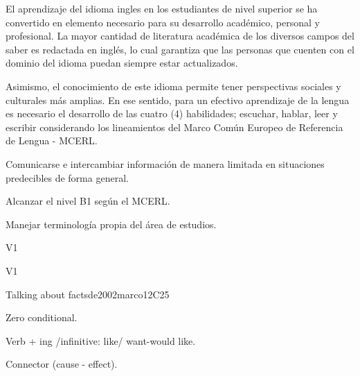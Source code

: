 \begin{syllabus}


\begin{justification}
El aprendizaje del idioma ingles en los estudiantes de nivel superior 
se ha convertido en elemento necesario para su desarrollo académico, personal y 
profesional. La mayor cantidad de literatura académica de los diversos campos 
del saber es redactada en inglés, lo cual garantiza que las personas que 
cuenten con el dominio del idioma puedan siempre estar actualizados. 

Asimismo, el conocimiento de este idioma permite tener perspectivas sociales y 
culturales más amplias. En ese sentido, para un efectivo aprendizaje de la 
lengua es necesario el desarrollo de las cuatro (4) habilidades; escuchar, 
hablar, leer y escribir considerando los lineamientos del 
Marco Común Europeo de Referencia de Lengua - MCERL.
\end{justification}

\begin{goals}
\item Comunicarse e intercambiar información de manera limitada en situaciones predecibles de forma general.
\item Alcanzar el nivel B1 según el MCERL.
\item Manejar terminología propia del área de estudios.
\end{goals}

\begin{outcomes}{V1}
\item {}
\end{outcomes}

\begin{competences}{V1}
\item {}
\end{competences}

\begin{unit}{Talking about facts}{}{de2002marco}{12}{C25}
   \begin{topics}
      \item Zero conditional.
      \item Verb + ing /infinitive: like/ want-would like.
      \item Connector (cause - effect).
   \end{topics}


\end{unit}
\end{syllabus}
